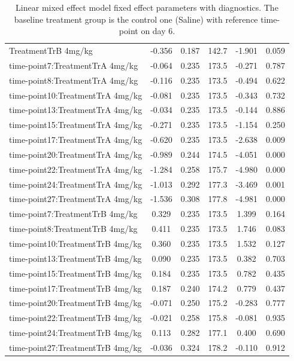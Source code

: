 \begin{table}
\begin{tabular}{lccccc}
		TreatmentTrB 4mg/kg             & -0.356      & 0.187     & 142.7 & -1.901  & 0.059   \\
		time-point7:TreatmentTrA 4mg/kg  & -0.064      & 0.235     & 173.5 & -0.271  & 0.787   \\
		time-point8:TreatmentTrA 4mg/kg  & -0.116      & 0.235     & 173.5 & -0.494  & 0.622   \\
		time-point10:TreatmentTrA 4mg/kg & -0.081      & 0.235     & 173.5 & -0.343  & 0.732   \\
		time-point13:TreatmentTrA 4mg/kg & -0.034      & 0.235     & 173.5 & -0.144  & 0.886   \\
		time-point15:TreatmentTrA 4mg/kg & -0.271      & 0.235     & 173.5 & -1.154  & 0.250   \\
		time-point17:TreatmentTrA 4mg/kg & -0.620      & 0.235     & 173.5 & -2.638  & 0.009   \\
		time-point20:TreatmentTrA 4mg/kg & -0.989      & 0.244     & 174.5 & -4.051  & 0.000   \\
		time-point22:TreatmentTrA 4mg/kg & -1.284      & 0.258     & 175.7 & -4.980  & 0.000   \\
		time-point24:TreatmentTrA 4mg/kg & -1.013      & 0.292     & 177.3 & -3.469  & 0.001   \\
		time-point27:TreatmentTrA 4mg/kg & -1.536      & 0.308     & 177.8 & -4.981  & 0.000   \\
		time-point7:TreatmentTrB 4mg/kg  & 0.329       & 0.235     & 173.5 & 1.399   & 0.164   \\
		time-point8:TreatmentTrB 4mg/kg  & 0.411       & 0.235     & 173.5 & 1.746   & 0.083   \\
		time-point10:TreatmentTrB 4mg/kg & 0.360       & 0.235     & 173.5 & 1.532   & 0.127   \\
		time-point13:TreatmentTrB 4mg/kg & 0.090       & 0.235     & 173.5 & 0.382   & 0.703   \\
		time-point15:TreatmentTrB 4mg/kg & 0.184       & 0.235     & 173.5 & 0.782   & 0.435   \\
		time-point17:TreatmentTrB 4mg/kg & 0.187       & 0.240     & 174.2 & 0.779   & 0.437   \\
		time-point20:TreatmentTrB 4mg/kg & -0.071      & 0.250     & 175.2 & -0.283  & 0.777   \\
		time-point22:TreatmentTrB 4mg/kg & -0.021      & 0.258     & 175.8 & -0.081  & 0.935   \\
		time-point24:TreatmentTrB 4mg/kg & 0.113       & 0.282     & 177.1 & 0.400   & 0.690   \\
		time-point27:TreatmentTrB 4mg/kg & -0.036      & 0.324     & 178.2 & -0.110  & 0.912   \\
		\hline
	\end{tabular}
	\caption{Linear mixed effect model fixed effect parameters with diagnostics.
	The baseline treatment group is the control one (Saline) with reference time-point on day 6.}
	\label{LME_factor_TrA_TrB_baseline_Saline}
\end{table}



